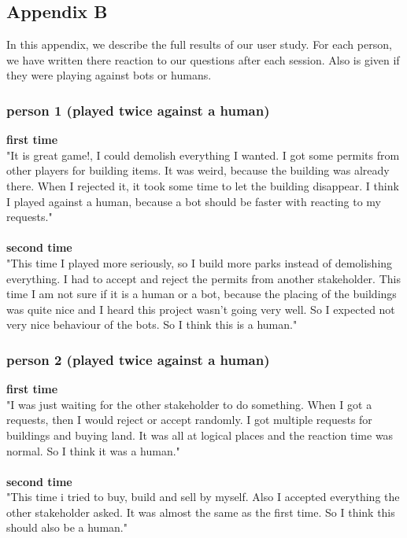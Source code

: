 \subsection{Appendix B}
In this appendix, we describe the full results of our user study. For each person, we have written there reaction to our questions after each session. Also is given if they were playing against bots or humans.
\subsubsection{person 1 (played twice against a human)}
\textbf{first time}\\
"It is  great game!, I could demolish everything I wanted. I got some permits from other players for building items. It was weird, because the building was already there. When I rejected it, it took some time to let the building disappear. I think I played against a human, because a bot should be faster with reacting to my requests."
\\ \\
\textbf{second time}\\
"This time I played more seriously, so I build more parks instead of demolishing everything. I had to accept and reject the permits from another stakeholder. This time I am not sure if it is a human or a bot, because the placing of the buildings was quite nice and I heard this project wasn't going very well. So I expected not very nice behaviour of the bots. So I think this is a human."

\subsubsection{person 2 (played twice against a human)}
\textbf{first time}\\
"I was just waiting for the other stakeholder to do something. When I got a requests, then I would reject or accept randomly. I got multiple requests for buildings and buying land. It was all at logical places and the reaction time was normal. So I think it was a human."
\\ \\
\textbf{second time}\\
"This time i tried to buy, build and sell by myself. Also I accepted everything the other stakeholder asked. It was almost the same as the first time. So I think this should also be a human."

